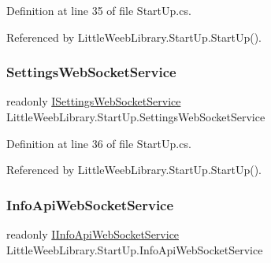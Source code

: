Definition at line 35 of file Start\+Up.\+cs.



Referenced by Little\+Weeb\+Library.\+Start\+Up.\+Start\+Up().

\mbox{\label{class_little_weeb_library_1_1_start_up_aa6541f1fbf659fd81e0497cb3ed11904}} 
\subsubsection{\texorpdfstring{Settings\+Web\+Socket\+Service}{SettingsWebSocketService}}
{\footnotesize\ttfamily readonly \mbox{\hyperlink{interface_little_weeb_library_1_1_services_1_1_i_settings_web_socket_service}{I\+Settings\+Web\+Socket\+Service}} Little\+Weeb\+Library.\+Start\+Up.\+Settings\+Web\+Socket\+Service\hspace{0.3cm}{\ttfamily [private]}}



Definition at line 36 of file Start\+Up.\+cs.



Referenced by Little\+Weeb\+Library.\+Start\+Up.\+Start\+Up().

\mbox{\label{class_little_weeb_library_1_1_start_up_af07b74fa1eae59d33216c2931d0f764a}} 
\subsubsection{\texorpdfstring{Info\+Api\+Web\+Socket\+Service}{InfoApiWebSocketService}}
{\footnotesize\ttfamily readonly \mbox{\hyperlink{interface_little_weeb_library_1_1_services_1_1_i_info_api_web_socket_service}{I\+Info\+Api\+Web\+Socket\+Service}} Little\+Weeb\+Library.\+Start\+Up.\+Info\+Api\+Web\+Socket\+Service\hspace{0.3cm}{\ttfamily [private]}}



